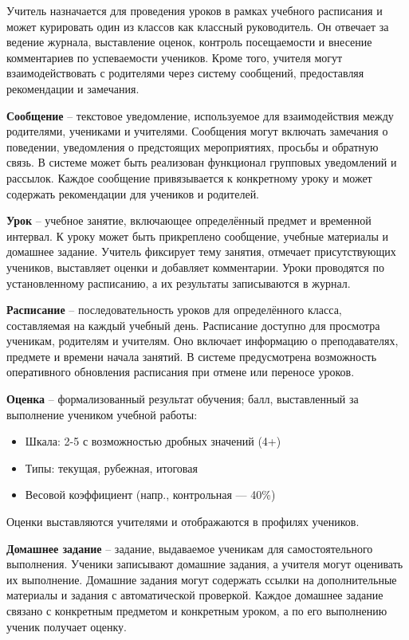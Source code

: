 \documentclass[a4paper, final]{article}
\begin{document}
Учитель назначается для проведения уроков в рамках учебного расписания и может курировать один из классов как классный руководитель. Он отвечает за ведение журнала, выставление оценок, контроль посещаемости и внесение комментариев по успеваемости учеников. Кроме того, учителя могут взаимодействовать с родителями через систему сообщений, предоставляя рекомендации и замечания.

\textbf{Сообщение} -- текстовое уведомление, используемое для взаимодействия между родителями, учениками и учителями. Сообщения могут включать замечания о поведении, уведомления о предстоящих мероприятиях, просьбы и обратную связь. В системе может быть реализован функционал групповых уведомлений и рассылок. Каждое сообщение привязывается к конкретному уроку и может содержать рекомендации для учеников и родителей.

\textbf{Урок} -- учебное занятие, включающее определённый предмет и временной интервал. К уроку может быть прикреплено сообщение, учебные материалы и домашнее задание. Учитель фиксирует тему занятия, отмечает присутствующих учеников, выставляет оценки и добавляет комментарии. Уроки проводятся по установленному расписанию, а их результаты записываются в журнал.

\textbf{Расписание} -- последовательность уроков для определённого класса, составляемая на каждый учебный день. Расписание доступно для просмотра ученикам, родителям и учителям. Оно включает информацию о преподавателях, предмете и времени начала занятий. В системе предусмотрена возможность оперативного обновления расписания при отмене или переносе уроков.

\textbf{Оценка} -- формализованный результат обучения; балл, выставленный за выполнение учеником учебной работы: 
\begin{itemize}
  \item Шкала: 2-5 с возможностью дробных значений (4+)
  \item Типы: текущая, рубежная, итоговая
  \item Весовой коэффициент (напр., контрольная — 40\%)
\end{itemize}
Оценки выставляются учителями и отображаются в профилях учеников.

\textbf{Домашнее задание} -- задание, выдаваемое ученикам для самостоятельного выполнения. Ученики записывают домашние задания, а учителя могут оценивать их выполнение. Домашние задания могут содержать ссылки на дополнительные материалы и задания с автоматической проверкой. Каждое домашнее задание связано с конкретным предметом и конкретным уроком, а по его выполнению ученик получает оценку.
\end{document}
